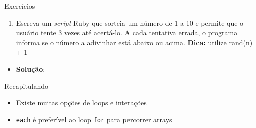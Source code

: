 \begin{frame}{Exercícios}
  \begin{enumerate}
    \item Escreva um \textit{script} Ruby que sorteia um número de 1 a 10 e permite que 
    o usuário tente 3 vezes até acertá-lo. A cada tentativa errada, o programa informa
    se o número a adivinhar está abaixo ou acima. \textbf{Dica:} utilize rand(n) + 1 
  \end{enumerate}
\framebreak
  \begin{itemize}
    \item \textbf{Solução}:
  \end{itemize}	
  
\end{frame}

\begin{frame}[fragile,t]{Recapitulando}
  \begin{itemize}
    \item Existe muitas opções de loops e interações
    \item \verb!each! é \alert{preferível} ao loop \verb!for! para percorrer arrays
  \end{itemize}
\end{frame}



